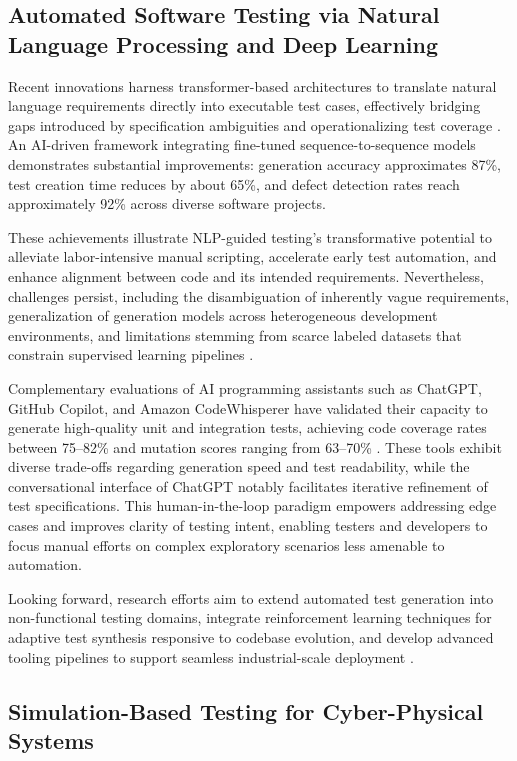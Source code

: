 \subsection{Automated Software Testing via Natural Language Processing and Deep Learning}

Recent innovations harness transformer-based architectures to translate natural language requirements directly into executable test cases, effectively bridging gaps introduced by specification ambiguities and operationalizing test coverage \cite{ref30}. An AI-driven framework integrating fine-tuned sequence-to-sequence models demonstrates substantial improvements: generation accuracy approximates 87\%, test creation time reduces by about 65\%, and defect detection rates reach approximately 92\% across diverse software projects.

These achievements illustrate NLP-guided testing's transformative potential to alleviate labor-intensive manual scripting, accelerate early test automation, and enhance alignment between code and its intended requirements. Nevertheless, challenges persist, including the disambiguation of inherently vague requirements, generalization of generation models across heterogeneous development environments, and limitations stemming from scarce labeled datasets that constrain supervised learning pipelines \cite{ref30}.

Complementary evaluations of AI programming assistants such as ChatGPT, GitHub Copilot, and Amazon CodeWhisperer have validated their capacity to generate high-quality unit and integration tests, achieving code coverage rates between 75--82\% and mutation scores ranging from 63--70\% \cite{ref32}. These tools exhibit diverse trade-offs regarding generation speed and test readability, while the conversational interface of ChatGPT notably facilitates iterative refinement of test specifications. This human-in-the-loop paradigm empowers addressing edge cases and improves clarity of testing intent, enabling testers and developers to focus manual efforts on complex exploratory scenarios less amenable to automation.

Looking forward, research efforts aim to extend automated test generation into non-functional testing domains, integrate reinforcement learning techniques for adaptive test synthesis responsive to codebase evolution, and develop advanced tooling pipelines to support seamless industrial-scale deployment \cite{ref30}.

\subsection{Simulation-Based Testing for Cyber-Physical Systems}

